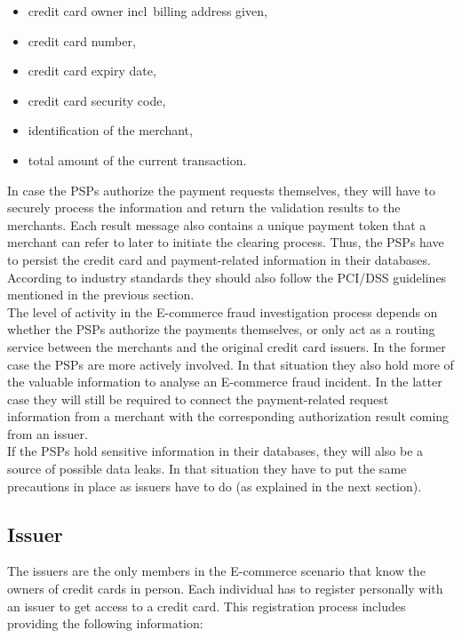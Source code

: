 \begin{itemize}
		\item credit card owner \gls{incl}\ billing address given,
		\item credit card number,
		\item credit card expiry date,
		\item credit card security code,
		\item identification of the merchant,
		\item total amount of the current transaction.
\end{itemize}

In case the \gls{PSP}s authorize the payment requests themselves, they will have to securely process the information and return the validation results to the merchants. Each result message also contains a unique payment token that a merchant can refer to later to initiate the clearing process. Thus, the \gls{PSP}s have to persist the credit card and payment-related information in their databases. According to industry standards they should also follow the \gls{PCI/DSS} guidelines mentioned in the previous section. \\

The level of activity in the \gls{E-commerce} fraud investigation process depends on whether the \gls{PSP}s authorize the payments themselves, or only act as a routing service between the merchants and the original credit card issuers. In the former case the \gls{PSP}s are more actively involved. In that situation they also hold more of the valuable information to analyse an \gls{E-commerce} fraud incident. In the latter case they will still be required to connect the payment-related request information from a merchant with the corresponding authorization result coming from an issuer. \\

If the \gls{PSP}s hold sensitive information in their databases, they will also be a source of possible data leaks. In that situation they have to put the same precautions in place as issuers have to do (as explained in the next section).


\subsection{Issuer}
\label{subsec:stakeholder_issuer}

The issuers are the only members in the \gls{E-commerce} scenario that know the owners of credit cards in person. Each individual has to register personally with an issuer to get access to a credit card. This registration process includes providing the following information: \@

